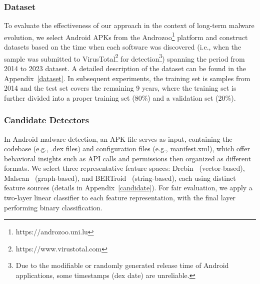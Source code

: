 \subsubsection{Dataset}
\label{Dataset}
To evaluate the effectiveness of our approach in the context of long-term malware evolution, we select Android APKs from the Androzoo\footnote{https://androzoo.uni.lu} platform and construct datasets based on the time when each software was discovered (i.e., when the sample was submitted to VirusTotal\footnote{https://www.virustotal.com} for detection\footnote{Due to the modifiable or randomly generated release time of Android applications, some timestamps (dex date) are unreliable.}) spanning the period from 2014 to 2023 dataset. A detailed description of the dataset can be found in the Appendix~\ref{dataset}. In subsequent experiments, the training set is samples from 2014 and the test set covers the remaining 9 years, where the training set is further divided into a proper training set (80\%) and a validation set (20\%).




\subsubsection{Candidate Detectors}
In Android malware detection, an APK file serves as input, containing the codebase (e.g., .dex files) and configuration files (e.g., manifest.xml), which offer behavioral insights such as API calls and permissions then organized as different formats. We select three representative feature spaces: Drebin~\cite{Arpdrebin} (vector-based), Malscan~\cite{malscan} (graph-based), and BERTroid~\cite{bertroid} (string-based), each using distinct feature sources (details in Appendix~\ref{candidate}). For fair evaluation, we apply a two-layer linear classifier to each feature representation, with the final layer performing binary classification.




